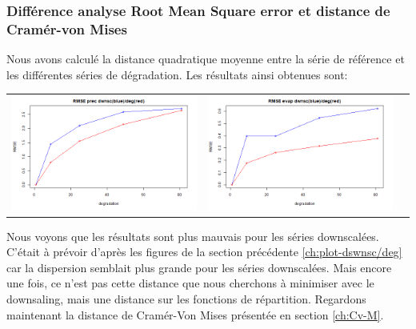 \documentclass[a4paper,11pt]{article}
\begin{document}
 

\subsubsection{Différence analyse Root Mean Square error et distance de Cramér-von Mises}
\label{ch:diff-RMSE}

Nous avons calculé la distance quadratique moyenne entre la série de référence et les différentes séries de dégradation. Les résultats ainsi obtenues sont:

\vspace{0.5cm}

\hspace{-1cm}
\begin{tabular}{ccc}
	\includegraphics[scale=0.4]{images/RMSE_precip.png} & \includegraphics[scale=0.4]{images/RMSE_evap.png}  \\
\end{tabular} 

Nous voyons que les résultats sont plus mauvais pour les séries downscalées. C'était à prévoir d'après les figures de la section précédente \ref{ch:plot-dswnsc/deg} car la dispersion semblait plus grande pour les séries downscalées. Mais encore une fois, ce n'est pas cette distance que nous cherchons à minimiser avec le downsaling, mais une distance sur les fonctions de répartition. Regardons maintenant la distance de Cramér-Von Mises présentée en section \ref{ch:Cv-M}.
\end{document}
